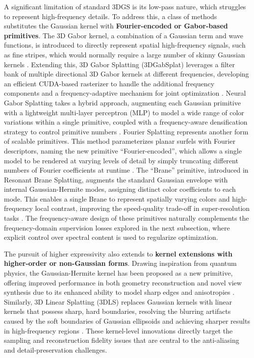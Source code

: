 \documentclass[11pt]{article}
\begin{document}
A significant limitation of standard 3DGS is its low-pass nature, which struggles to represent high-frequency details. To address this, a class of methods substitutes the Gaussian kernel with \textbf{Fourier-encoded or Gabor-based primitives}. The 3D Gabor kernel, a combination of a Gaussian term and wave functions, is introduced to directly represent spatial high-frequency signals, such as fine stripes, which would normally require a large number of skinny Gaussian kernels \cite{ref62}. Extending this, 3D Gabor Splatting (3DGabSplat) leverages a filter bank of multiple directional 3D Gabor kernels at different frequencies, developing an efficient CUDA-based rasterizer to handle the additional frequency components and a frequency-adaptive mechanism for joint optimization \cite{ref63}. Neural Gabor Splatting takes a hybrid approach, augmenting each Gaussian primitive with a lightweight multi-layer perceptron (MLP) to model a wide range of color variations within a single primitive, coupled with a frequency-aware densification strategy to control primitive numbers \cite{ref64}. Fourier Splatting represents another form of scalable primitives. This method parameterizes planar surfels with Fourier descriptors, naming the new primitive ``Fourier-encoded'', which allows a single model to be rendered at varying levels of detail by simply truncating different numbers of Fourier coefficients at runtime \cite{ref65}. The ``Brane'' primitive, introduced in Resonant Brane Splatting, augments the standard Gaussian envelope with internal Gaussian-Hermite modes, assigning distinct color coefficients to each mode. This enables a single Brane to represent spatially varying colors and high-frequency local contrast, improving the speed-quality trade-off in super-resolution tasks \cite{ref66}. The frequency-aware design of these primitives naturally complements the frequency-domain supervision losses explored in the next subsection, where explicit control over spectral content is used to regularize optimization.

The pursuit of higher expressivity also extends to \textbf{kernel extensions with higher-order or non-Gaussian forms}. Drawing inspiration from quantum physics, the Gaussian-Hermite kernel has been proposed as a new primitive, offering improved performance in both geometry reconstruction and novel view synthesis due to its enhanced ability to model sharp edges and anisotropies \cite{ref67}. Similarly, 3D Linear Splatting (3DLS) replaces Gaussian kernels with linear kernels that possess sharp, hard boundaries, resolving the blurring artifacts caused by the soft boundaries of Gaussian ellipsoids and achieving sharper results in high-frequency regions \cite{ref68}. These kernel-level innovations directly target the sampling and reconstruction fidelity issues that are central to the anti-aliasing and detail-preservation challenges.
\end{document}
